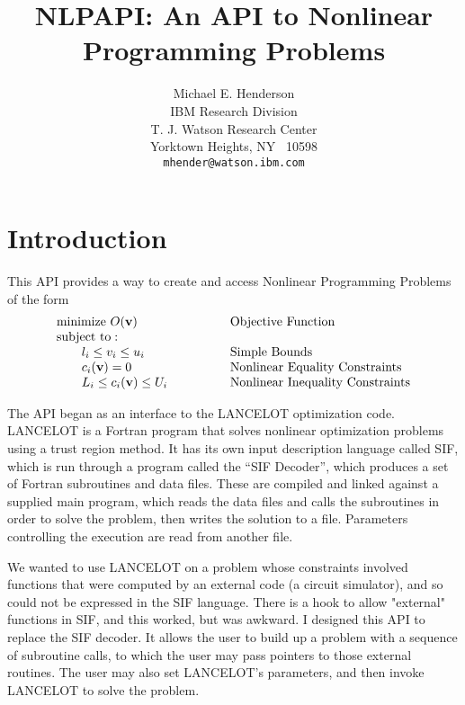 \documentclass[12pt]{article}
\title{NLPAPI: An API to Nonlinear Programming Problems}
\author{
  Michael E. Henderson\\[.5\baselineskip]
  IBM Research Division\\
  T. J. Watson Research Center\\
  Yorktown Heights, NY ~10598\\
  {\tt mhender@watson.ibm.com}
 }
\begin{document}
  \maketitle

   \section{Introduction}

    This API provides a way to create and access Nonlinear Programming Problems of the
    form 
    \begin{displaymath}
     \begin{array}{ll}
      {\rm minimize}~O({\bf v})& \qquad\qquad \rm Objective~Function\\
      {\rm subject~to:}\\
      \qquad l_i \leq v_i \leq u_i& \qquad\qquad  \rm Simple~Bounds\\
      \qquad c_i({\bf v}) = 0& \qquad\qquad \rm Nonlinear~Equality
                                                      ~Constraints\\
      \qquad L_i \leq c_i({\bf v}) \leq U_i& \qquad\qquad \rm Nonlinear
                                                      ~Inequality~Constraints\\
     \end{array}
    \end{displaymath}

     The API began as an interface to the LANCELOT optimization code.
    LANCELOT is a Fortran program that solves nonlinear optimization 
    problems using a trust region method. It has its own input description language called SIF, 
    which is run through a program called the ``SIF Decoder'', which 
    produces a set of Fortran subroutines and data files. 
    These are compiled and linked against a supplied main program,
    which reads the data files and calls the subroutines
    in order to solve the problem, then writes the solution to a file.
    Parameters controlling the execution are read from another file.

    We wanted to use LANCELOT on a problem whose constraints involved functions
    that were computed by an external code (a circuit simulator), and so could
    not be expressed in the SIF language. There is a hook to allow "external"
    functions in SIF, and this worked, but was awkward. I designed this API to
    replace the SIF decoder. It allows the user to build up a problem
    with a sequence of subroutine calls, to which the user may pass pointers 
    to those external routines. The user may also set LANCELOT's parameters, and
    then invoke LANCELOT to solve the problem.
\end{document}
